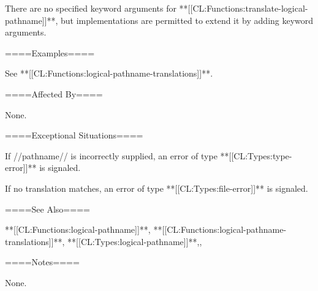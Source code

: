 There are no specified keyword arguments for **[[CL:Functions:translate-logical-pathname]]**, but implementations are permitted to extend it by adding keyword arguments.



====Examples====

See **[[CL:Functions:logical-pathname-translations]]**.

====Affected By====

None.

====Exceptional Situations====

If //pathname// is incorrectly supplied, an error of type **[[CL:Types:type-error]]** is signaled.

If no translation matches, an error of type **[[CL:Types:file-error]]** is signaled. 

====See Also====

**[[CL:Functions:logical-pathname]]**, **[[CL:Functions:logical-pathname-translations]]**, **[[CL:Types:logical-pathname]]**,{\secref\FileSystemConcepts},

{\secref\PathnamesAsFilenames}

====Notes====

None.

   
